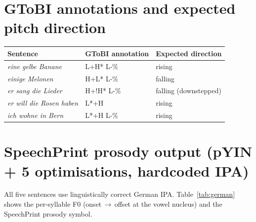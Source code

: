 \section*{GToBI annotations and expected pitch direction}

\begin{table}[h]
\centering
\small
\begin{tabular}{lll}
\toprule
Sentence & GToBI annotation & Expected direction \\
\midrule
\textit{eine gelbe Banane}       & L+H* L-\%  & rising \\
\textit{einige Melonen}          & H+L* L-\%  & falling \\
\textit{er sang die Lieder}      & H+!H* L-\% & falling (downstepped) \\
\textit{er will die Rosen haben} & L*+H       & rising \\
\textit{ich wohne in Bern}       & L*+H L-\%  & rising \\
\bottomrule
\end{tabular}
\end{table}

\section*{SpeechPrint prosody output (pYIN + 5 optimisations, hardcoded IPA)}

All five sentences use linguistically correct German IPA.
Table~\ref{tab:german} shows the per-syllable F0 (onset\,$\to$\,offset at the
vowel nucleus) and the SpeechPrint prosody symbol.


